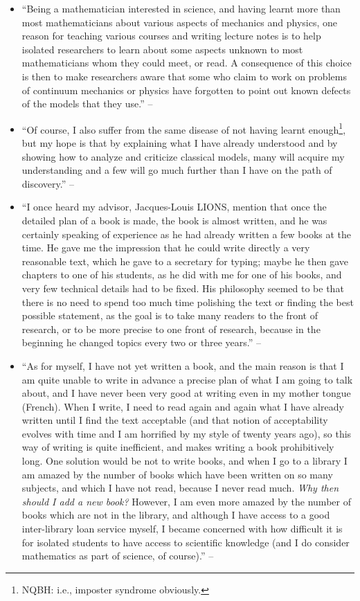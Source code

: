 \documentclass[oneside]{book}
\numberwithin{equation}{section}
\begin{document}
\begin{enumerate}
\begin{itemize}
		\item ``Being a mathematician interested in science, and having learnt more than most mathematicians about various aspects of mechanics and physics, one reason for teaching various courses and writing lecture notes is to help isolated researchers to learn about some aspects unknown to most mathematicians whom they could meet, or read. A consequence of this choice is then to make researchers aware that some who claim to work on problems of continuum mechanics or physics have forgotten to point out known defects of the models that they use.'' -- \cite[Preface, pp. viii--ix]{Tartar2006}
		\item ``Of course, I also suffer from the same disease of not having learnt enough\footnote{NQBH: i.e., imposter syndrome obviously.}, but my hope is that by explaining what I have already understood and by showing how to analyze and criticize classical models, many will acquire my understanding and a few will go much further than I have on the path of discovery.'' -- \cite[Preface, p. ix]{Tartar2006}
		\item ``I once heard my advisor, Jacques-Louis LIONS, mention that once the detailed plan of a book is made, the book is almost written, and he was certainly speaking of experience as he had already written a few books at the time. He gave me the impression that he could write directly a very reasonable text, which he gave to a secretary for typing; maybe he then gave chapters to one of his students, as he did with me for one of his books, and very few technical details had to be fixed. His philosophy seemed to be that there is no need to spend too much time polishing the text or finding the best possible statement, as the goal is to take many readers to the front of research, or to be more precise to one front of research, because in the beginning he changed topics every two or three years.'' -- \cite[Preface, p. ix]{Tartar2006}
		\item ``As for myself, I have not yet written a book, and the main reason is that I am quite unable to write in advance a precise plan of what I am going to talk about, and I have never been very good at writing even in my mother tongue (French). When I write, I need to read again and again what I have already written until I find the text acceptable (and that notion of acceptability evolves with time and I am horrified by my style of twenty years ago), so this way of writing is quite inefficient, and makes writing a book prohibitively long. One solution would be not to write books, and when I go to a library I am amazed by the number of books which have been written on so many subjects, and which I have not read, because I never read much. \textit{Why then should I add a new book?} However, I am even more amazed by the number of books which are not in the library, and although I have access to a good inter-library loan service myself, I became concerned with how difficult it is for isolated students to have access to scientific knowledge (and I do consider mathematics as part of science, of course).'' -- \cite[Preface, p. ix]{Tartar2006}

\end{itemize}
\end{enumerate}
\end{document}
